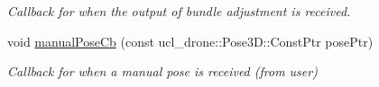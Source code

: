 \begin{DoxyCompactItemize}
\begin{DoxyCompactList}\small\item\em Callback for when the output of bundle adjustment is received. \end{DoxyCompactList}\item 
\mbox{\label{classMappingNode_a63b44a6796f1990ca5e5c0a2d39b1646}} 
void \hyperlink{classMappingNode_a63b44a6796f1990ca5e5c0a2d39b1646}{manual\+Pose\+Cb} (const ucl\+\_\+drone\+::\+Pose3\+D\+::\+Const\+Ptr pose\+Ptr)
\begin{DoxyCompactList}\small\item\em Callback for when a manual pose is received (from user) \end{DoxyCompactList}\end{DoxyCompactItemize}

